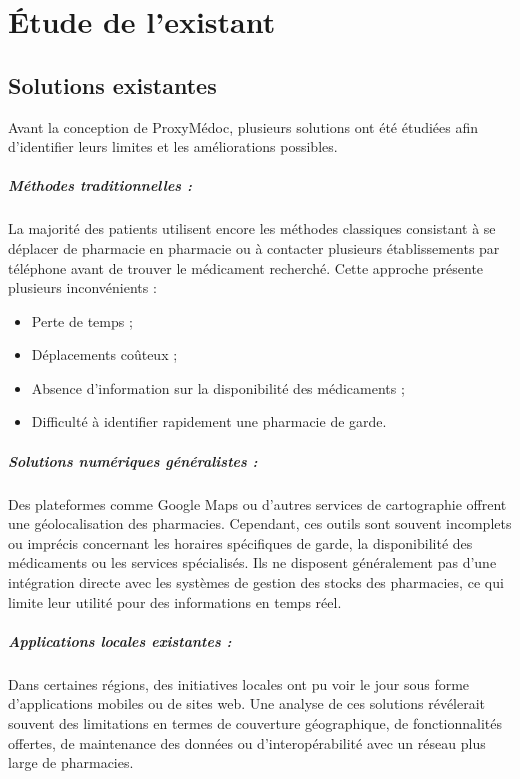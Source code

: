 \documentclass[12pt,a4paper]{report}
\begin{document}
	\chapter{Étude de l'existant} %
	
	\section{Solutions existantes} %
	Avant la conception de ProxyMédoc, plusieurs solutions ont été étudiées afin d'identifier leurs limites et les améliorations possibles. %
	\paragraph{Méthodes traditionnelles :} La majorité des patients utilisent encore les méthodes classiques consistant à se déplacer de pharmacie en pharmacie ou à contacter plusieurs établissements par téléphone avant de trouver le médicament recherché. %
	Cette approche présente plusieurs inconvénients : %
	\begin{itemize} %
		\item Perte de temps ; %
		\item Déplacements coûteux ; %
		\item Absence d'information sur la disponibilité des médicaments ; %
		\item Difficulté à identifier rapidement une pharmacie de garde. %
	\end{itemize} %
	
	\paragraph{Solutions numériques généralistes :} Des plateformes comme Google Maps ou d'autres services de cartographie offrent une géolocalisation des pharmacies. %
	Cependant, ces outils sont souvent incomplets ou imprécis concernant les horaires spécifiques de garde, la disponibilité des médicaments ou les services spécialisés. %
	Ils ne disposent généralement pas d'une intégration directe avec les systèmes de gestion des stocks des pharmacies, ce qui limite leur utilité pour des informations en temps réel. %
	\paragraph{Applications locales existantes :} Dans certaines régions, des initiatives locales ont pu voir le jour sous forme d'applications mobiles ou de sites web. %
	Une analyse de ces solutions révélerait souvent des limitations en termes de couverture géographique, de fonctionnalités offertes, de maintenance des données ou d'interopérabilité avec un réseau plus large de pharmacies. %
	
\end{document}
